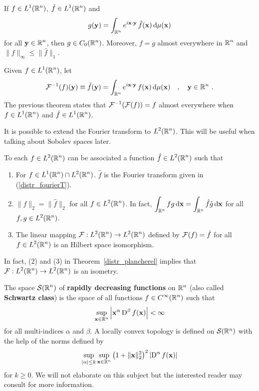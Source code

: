 \begin{prop} \label{distr_inv_four_transf}
If $\displaystyle f \in L^1(\mathbb{R}^n)$, $\displaystyle \hat{f} \in L^1(\mathbb{R}^n)$ and
\[
g(\mathbf{y}) = \int_{\mathbb{R}^n} e^{i \mathbf{x}\cdot\mathbf{y}} \,
\hat{f}(\mathbf{x}) \,\mathrm{d}{\mu(\mathbf{x})}
\]
for all $\displaystyle \mathbf{y} \in \mathbb{R}^n$, then
$\displaystyle g \in C_0(\mathbb{R}^n)$.  Moreover, $f = g$ almost everywhere
in $\displaystyle \mathbb{R}^n$ and $\|f\|_\infty \leq \|\hat{f}\|_1$.
\end{prop}

Given $\displaystyle f\in L^1(\mathbb{R}^n)$, let
\[
\mathcal{F}^{-1}(f)(\mathbf{y}) \equiv \check{f}(\mathbf{y}) = 
\int_{\mathbb{R}^n} e^{i \mathbf{x}\cdot\mathbf{y}} \, f(\mathbf{x}) \,\mathrm{d}{\mu(\mathbf{x})}
\quad , \quad \mathbf{y} \in \mathbb{R}^n \ .
\]
The previous theorem states that $\displaystyle \mathcal{F}^{-1}(\mathcal{F}(f)) = f$
almost everywhere when $\displaystyle f \in L^1(\mathbb{R}^n)$
and $\displaystyle \hat{f} \in L^1(\mathbb{R}^n)$.

It is possible to extend the Fourier transform to $\displaystyle L^2(\mathbb{R}^n)$.
This will be useful when talking about Sobolev spaces later.

\begin{theorem}[Plancherel] \label{distr_plancherel}
To each $\displaystyle f\in L^2(\mathbb{R}^n)$ can be associated a function
$\displaystyle \hat{f} \in L^2(\mathbb{R}^n)$ such that   
\begin{enumerate}
\item For $\displaystyle f \in L^1(\mathbb{R}^n) \cap L^2(\mathbb{R}^n)$. $\hat{f}$ is the
Fourier transform given in (\ref{distr_fourierT}).
\item $\| f \|_2 = \|\hat{f}\|_2$ for all $\displaystyle f \in L^2(\mathbb{R}^n)$.
In fact, $\displaystyle \int_{\mathbb{R}^n} f g \,\mathrm{d}{\mathbf{x}} =
\int_{\mathbb{R}^n} \hat{f} \hat{g} \,\mathrm{d}{\mathbf{x}}$ for all
$\displaystyle f,g \in L^2(\mathbb{R}^n)$.
\item The linear mapping $\displaystyle \mathcal{F}: L^2(\mathbb{R}^n) \rightarrow L^2(\mathbb{R}^n)$
defined by $\mathcal{F}(f) = \hat{f}$ for all $\displaystyle f \in L^2(\mathbb{R}^n)$
is an Hilbert space isomorphism.
\end{enumerate}
\end{theorem}

In fact, (2) and (3) in Theorem~\ref{distr_plancherel} implies that 
$\displaystyle \mathcal{F}: L^2(\mathbb{R}^n) \rightarrow L^2(\mathbb{R}^n)$ is an isometry.

The space $\displaystyle \mathcal{S}(\mathbb{R}^n)$ of
{\bfseries rapidly decreasing functions} on $\displaystyle \mathbb{R}^n$ (also called 
{\bfseries Schwartz class}) is the space of all
functions $\displaystyle f \in C^\infty(\mathbb{R}^n)$ such that
\[
\sup_{\mathbf{x} \in \mathbb{R}^n} \left| \mathbf{x}^\alpha \operatorname{D}^\beta f(\mathbf{x})
\right| < \infty
\]
for all multi-indices $\alpha$ and $\beta$.  A locally convex topology
is defined on $\mathcal{S}(\mathbb{R}^n)$ with the help of the norms defined by
\[
\sup_{|\alpha|\leq k} \sup_{\mathbf{x} \in \mathbb{R}^n} \left( 1 + \|\mathbf{x}\|_2^2\right)^2
\left| \operatorname{D}^\alpha f(\mathbf{x}) \right|
\]
for $k \geq 0$.  We will not elaborate on this subject but the
interested reader may consult \cite{RuFA,ReeSim} for more information.

